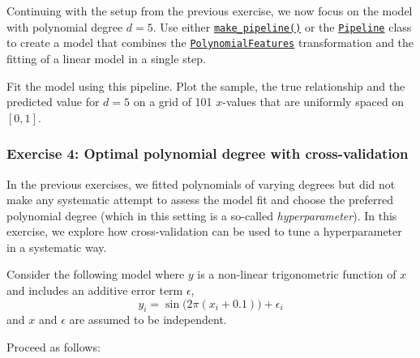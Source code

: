 \documentclass{scrartcl}
\begin{document}
Continuing with the setup from the previous exercise, we now focus on
the model with polynomial degree \(d=5\). Use either
\href{https://scikit-learn.org/stable/modules/generated/sklearn.pipeline.make_pipeline.html}{\texttt{make\_pipeline()}}
or the
\href{https://scikit-learn.org/stable/modules/generated/sklearn.pipeline.Pipeline.html}{\texttt{Pipeline}}
class to create a model that combines the
\href{https://scikit-learn.org/stable/modules/generated/sklearn.preprocessing.PolynomialFeatures.html}{\texttt{PolynomialFeatures}}
transformation and the fitting of a linear model in a single step.

Fit the model using this pipeline. Plot the sample, the true
relationship and the predicted value for \(d=5\) on a grid of 101
\(x\)-values that are uniformly spaced on \([0, 1]\).

    \hypertarget{exercise-4-optimal-polynomial-degree-with-cross-validation}{%
\subsubsection{Exercise 4: Optimal polynomial degree with
cross-validation}\label{exercise-4-optimal-polynomial-degree-with-cross-validation}}

In the previous exercises, we fitted polynomials of varying degrees but
did not make any systematic attempt to assess the model fit and choose
the preferred polynomial degree (which in this setting is a so-called
\emph{hyperparameter}). In this exercise, we explore how
cross-validation can be used to tune a hyperparameter in a systematic
way.

Consider the following model where \(y\) is a non-linear trigonometric
function of \(x\) and includes an additive error term \(\epsilon\), \[
y_i = \sin\bigl(2 \pi (x_i + 0.1) \bigr) + \epsilon_i
\] and \(x\) and \(\epsilon\) are assumed to be independent.

Proceed as follows:
\end{document}
